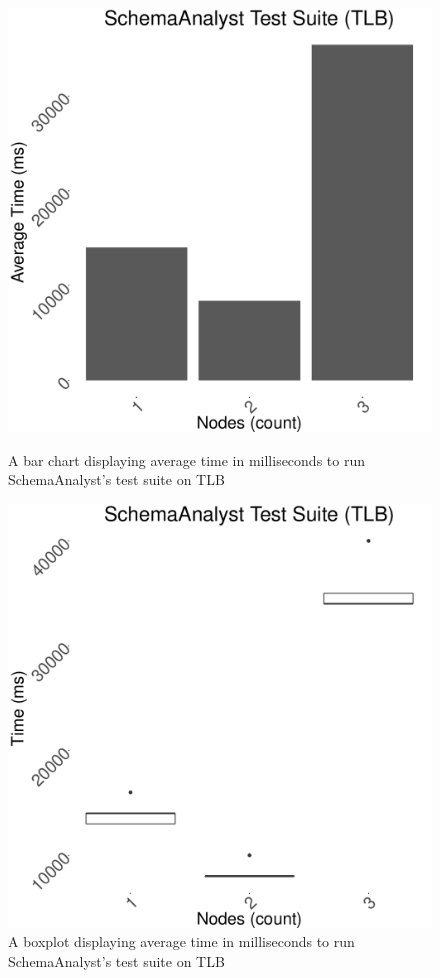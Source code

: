 \documentclass{article}
\begin{document}
{\begin{figure}[H]
  \centering
  \begin{minipage}[b]{0.4\textwidth}
    \includegraphics[width=\textwidth]{../data/graphs/sa_bar_tlb.pdf}
    \caption{A bar chart displaying average time in milliseconds to run SchemaAnalyst's test suite on TLB}
    \label{sabar}
  \end{minipage}
  \hfill
  \begin{minipage}[b]{0.4\textwidth}
    \includegraphics[width=\textwidth]{../data/graphs/sa_boxplot_tlb.pdf}
    \caption{A boxplot displaying average time in milliseconds to run SchemaAnalyst's test suite on TLB}
    \label{sabox}
  \end{minipage}
\end{figure}

}
\end{document}
